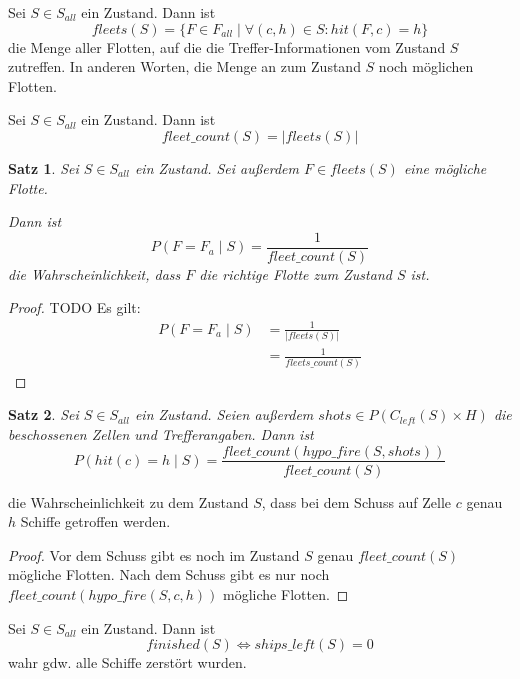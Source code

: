 \documentclass[a4paper,12pt]{llncs}
\numberwithin{equation}{section}
\newtheorem{satz}{Satz}
\begin{document}
\begin{definition}
Sei $S\in S_{all}$ ein Zustand.
Dann ist
\[
fleets(S)=\{F\in F_{all} \mid \forall (c,h) \in S \colon hit(F, c)=h\}
\]
die Menge aller Flotten, auf die die Treffer-Informationen vom Zustand $S$ zutreffen.
In anderen Worten, die Menge an zum Zustand $S$ noch möglichen Flotten.
\end{definition}

\begin{definition}
Sei $S\in S_{all}$ ein Zustand.
Dann ist
\[
fleet\_count(S)=|fleets(S)|
\]
\end{definition}


\begin{satz}
Sei $S\in S_{all}$ ein Zustand.
Sei außerdem $F \in fleets(S)$ eine mögliche Flotte.

Dann ist
\[
P(F = F_a \mid S)=\frac{1}{fleet\_count(S)}
\]
die Wahrscheinlichkeit, dass $F$ die richtige Flotte zum Zustand $S$ ist.
\end{satz}

\begin{proof}
TODO
Es gilt:
\begin{align}
P(F=F_a\mid S)&= \frac{1}{\left|fleets(S)\right|} \nonumber\\
 &= \frac{1}{fleets\_count(S)}\nonumber
\end{align}
\end{proof}


\begin{satz}
Sei $S\in S_{all}$ ein Zustand.
Seien außerdem $shots \in P(C_{left}(S) \times H)$ die beschossenen Zellen und Trefferangaben.
Dann ist
\[
P(hit(c)=h \mid S)=\frac{fleet\_count(hypo\_fire(S, shots))}{fleet\_count(S)}
\]
\end{satz}
die Wahrscheinlichkeit zu dem Zustand $S$, dass bei dem Schuss auf Zelle $c$ genau $h$ Schiffe getroffen werden.

\begin{proof}
Vor dem Schuss gibt es noch im Zustand $S$ genau $fleet\_count(S)$ mögliche Flotten.
Nach dem Schuss gibt es nur noch \\$fleet\_count(hypo\_fire(S,c, h))$ mögliche Flotten.
\end{proof}

\begin{definition}
Sei $S\in S_{all}$ ein Zustand.
Dann ist
\[
finished(S) \Leftrightarrow ships\_left(S)=0
\]
wahr gdw. alle Schiffe zerstört wurden.
\end{definition}
\end{document}
